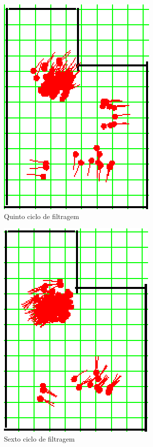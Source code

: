 \begin{figure}[H]
  \centering
  \includegraphics[scale=0.6]{figuras/cen1_ex2/6.eps}
  \caption[Quinto Ciclo de Filtragem]{Quinto ciclo de filtragem}
  \label{img:cen1_ex2_6}
\end{figure}

\begin{figure}[H]
  \centering
  \includegraphics[scale=0.6]{figuras/cen1_ex2/7.eps}
  \caption[Sexto Ciclo de Filtragem]{Sexto ciclo de filtragem}
  \label{img:cen1_ex2_7}
\end{figure}

